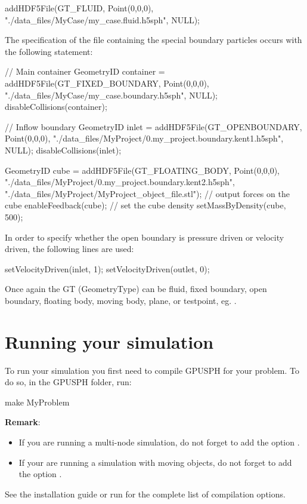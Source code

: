 \documentclass{../GPUSPHtemplate}
\begin{document}
\begin{ccode}
addHDF5File(GT_FLUID, Point(0,0,0), 
"./data_files/MyCase/my_case.fluid.h5sph",
NULL);
\end{ccode}
The specification of the file containing the special boundary particles occurs with the following statement:

\begin{ccode}
// Main container
GeometryID container =
addHDF5File(GT_FIXED_BOUNDARY, Point(0,0,0), 
  "./data_files/MyCase/my_case.boundary.h5sph",
  NULL);
disableCollisions(container);
  
// Inflow boundary 
GeometryID inlet =
  addHDF5File(GT_OPENBOUNDARY, Point(0,0,0), 
  "./data_files/MyProject/0.my_project.boundary.kent1.h5sph",
  NULL);
disableCollisions(inlet);

GeometryID cube =
  addHDF5File(GT_FLOATING_BODY, Point(0,0,0), 
  "./data_files/MyProject/0.my_project.boundary.kent2.h5sph",
  "./data_files/MyProject/MyProject_object_file.stl");
// output forces on the cube
enableFeedback(cube);
// set the cube density
setMassByDensity(cube, 500);

\end{ccode}

In order to specify whether the open boundary is pressure driven or velocity driven, the following lines
are used:
\begin{shellcode}
setVelocityDriven(inlet, 1);
setVelocityDriven(outlet, 0);
\end{shellcode}

Once again the GT (GeometryType) can be fluid, fixed boundary, open boundary, 
floating body, moving body, plane, or testpoint, eg. . 

\section{Running your simulation}\label{sec:run}
To run your simulation you first need to compile GPUSPH for your problem.
To do so, in the GPUSPH folder, run:
\begin{shellcode}
make MyProblem
\end{shellcode}
\textbf{Remark}:
\begin{itemize}
\item If you are running a multi-node simulation, do not forget to add the option
.
\item If your are running a simulation with moving objects, do not forget to add the
option .
\end{itemize}
See the installation guide or run  for the complete list of compilation options.
\end{document}
